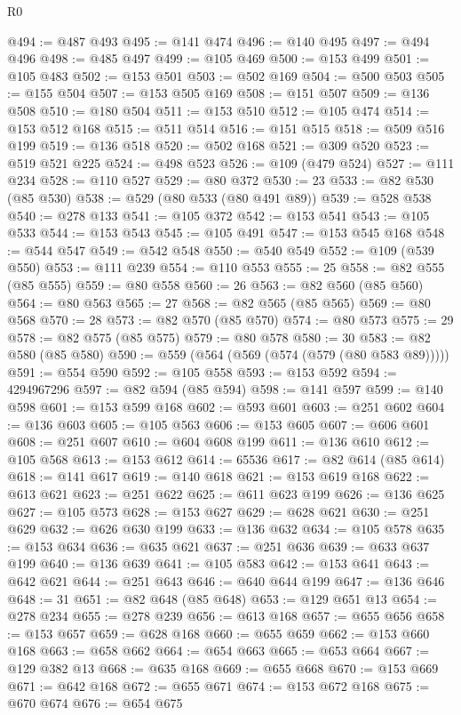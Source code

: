 \begin{lexlean}{R0}
\begin{coremodule}
@494 := @487 @493
@495 := @141 @474
@496 := @140 @495
@497 := @494 @496
@498 := @485 @497
@499 := @105 @469
@500 := @153 @499
@501 := @105 @483
@502 := @153 @501
@503 := @502 @169
@504 := @500 @503
@505 := @155 @504
@507 := @153 @505 @169
@508 := @151 @507
@509 := @136 @508
@510 := @180 @504
@511 := @153 @510
@512 := @105 @474
@514 := @153 @512 @168
@515 := @511 @514
@516 := @151 @515
@518 := @509 @516 @199
@519 := @136 @518
@520 := @502 @168
@521 := @309 @520
@523 := @519 @521 @225
@524 := @498 @523
@526 := @109 (@479 @524)
@527 := @111 @234
@528 := @110 @527
@529 := @80 @372
@530 := 23
@533 := @82 @530 (@85 @530)
@538 := @529 (@80 @533 (@80 @491 @89))
@539 := @528 @538
@540 := @278 @133
@541 := @105 @372
@542 := @153 @541
@543 := @105 @533
@544 := @153 @543
@545 := @105 @491
@547 := @153 @545 @168
@548 := @544 @547
@549 := @542 @548
@550 := @540 @549
@552 := @109 (@539 @550)
@553 := @111 @239
@554 := @110 @553
@555 := 25
@558 := @82 @555 (@85 @555)
@559 := @80 @558
@560 := 26
@563 := @82 @560 (@85 @560)
@564 := @80 @563
@565 := 27
@568 := @82 @565 (@85 @565)
@569 := @80 @568
@570 := 28
@573 := @82 @570 (@85 @570)
@574 := @80 @573
@575 := 29
@578 := @82 @575 (@85 @575)
@579 := @80 @578
@580 := 30
@583 := @82 @580 (@85 @580)
@590 := @559 (@564 (@569 (@574 (@579 (@80 @583 @89)))))
@591 := @554 @590
@592 := @105 @558
@593 := @153 @592
@594 := 4294967296
@597 := @82 @594 (@85 @594)
@598 := @141 @597
@599 := @140 @598
@601 := @153 @599 @168
@602 := @593 @601
@603 := @251 @602
@604 := @136 @603
@605 := @105 @563
@606 := @153 @605
@607 := @606 @601
@608 := @251 @607
@610 := @604 @608 @199
@611 := @136 @610
@612 := @105 @568
@613 := @153 @612
@614 := 65536
@617 := @82 @614 (@85 @614)
@618 := @141 @617
@619 := @140 @618
@621 := @153 @619 @168
@622 := @613 @621
@623 := @251 @622
@625 := @611 @623 @199
@626 := @136 @625
@627 := @105 @573
@628 := @153 @627
@629 := @628 @621
@630 := @251 @629
@632 := @626 @630 @199
@633 := @136 @632
@634 := @105 @578
@635 := @153 @634
@636 := @635 @621
@637 := @251 @636
@639 := @633 @637 @199
@640 := @136 @639
@641 := @105 @583
@642 := @153 @641
@643 := @642 @621
@644 := @251 @643
@646 := @640 @644 @199
@647 := @136 @646
@648 := 31
@651 := @82 @648 (@85 @648)
@653 := @129 @651 @13
@654 := @278 @234
@655 := @278 @239
@656 := @613 @168
@657 := @655 @656
@658 := @153 @657
@659 := @628 @168
@660 := @655 @659
@662 := @153 @660 @168
@663 := @658 @662
@664 := @654 @663
@665 := @653 @664
@667 := @129 @382 @13
@668 := @635 @168
@669 := @655 @668
@670 := @153 @669
@671 := @642 @168
@672 := @655 @671
@674 := @153 @672 @168
@675 := @670 @674
@676 := @654 @675

\end{coremodule}
\end{lexlean}
